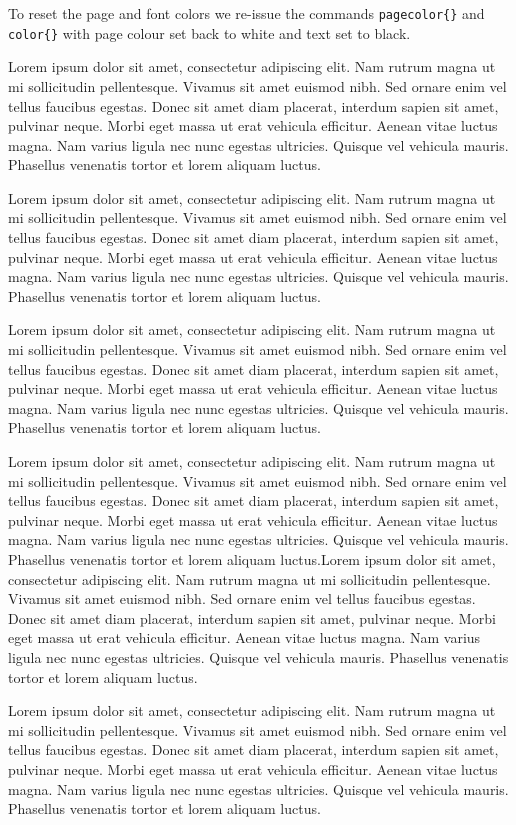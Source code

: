 \color{black}

To reset the page and font colors we re-issue the commands \verb|pagecolor{}| and  \verb|color{}| with page colour set back to white and text set to black. 

\vspace{0.4cm}

Lorem ipsum dolor sit amet, consectetur adipiscing elit. Nam rutrum magna ut mi sollicitudin pellentesque. Vivamus sit amet euismod nibh. Sed ornare enim vel tellus faucibus egestas. Donec sit amet diam placerat, interdum sapien sit amet, pulvinar neque. Morbi eget massa ut erat vehicula efficitur. Aenean vitae luctus magna. Nam varius ligula nec nunc egestas ultricies. Quisque vel vehicula mauris. Phasellus venenatis tortor et lorem aliquam luctus.


Lorem ipsum dolor sit amet, consectetur adipiscing elit. Nam rutrum magna ut mi sollicitudin pellentesque. Vivamus sit amet euismod nibh. Sed ornare enim vel tellus faucibus egestas. Donec sit amet diam placerat, interdum sapien sit amet, pulvinar neque. Morbi eget massa ut erat vehicula efficitur. Aenean vitae luctus magna. Nam varius ligula nec nunc egestas ultricies. Quisque vel vehicula mauris. Phasellus venenatis tortor et lorem aliquam luctus.


Lorem ipsum dolor sit amet, consectetur adipiscing elit. Nam rutrum magna ut mi sollicitudin pellentesque. Vivamus sit amet euismod nibh. Sed ornare enim vel tellus faucibus egestas. Donec sit amet diam placerat, interdum sapien sit amet, pulvinar neque. Morbi eget massa ut erat vehicula efficitur. Aenean vitae luctus magna. Nam varius ligula nec nunc egestas ultricies. Quisque vel vehicula mauris. Phasellus venenatis tortor et lorem aliquam luctus.



Lorem ipsum dolor sit amet, consectetur adipiscing elit. Nam rutrum magna ut mi sollicitudin pellentesque. Vivamus sit amet euismod nibh. Sed ornare enim vel tellus faucibus egestas. Donec sit amet diam placerat, interdum sapien sit amet, pulvinar neque. Morbi eget massa ut erat vehicula efficitur. Aenean vitae luctus magna. Nam varius ligula nec nunc egestas ultricies. Quisque vel vehicula mauris. Phasellus venenatis tortor et lorem aliquam luctus.Lorem ipsum dolor sit amet, consectetur adipiscing elit. Nam rutrum magna ut mi sollicitudin pellentesque. Vivamus sit amet euismod nibh. Sed ornare enim vel tellus faucibus egestas. Donec sit amet diam placerat, interdum sapien sit amet, pulvinar neque. Morbi eget massa ut erat vehicula efficitur. Aenean vitae luctus magna. Nam varius ligula nec nunc egestas ultricies. Quisque vel vehicula mauris. Phasellus venenatis tortor et lorem aliquam luctus.


Lorem ipsum dolor sit amet, consectetur adipiscing elit. Nam rutrum magna ut mi sollicitudin pellentesque. Vivamus sit amet euismod nibh. Sed ornare enim vel tellus faucibus egestas. Donec sit amet diam placerat, interdum sapien sit amet, pulvinar neque. Morbi eget massa ut erat vehicula efficitur. Aenean vitae luctus magna. Nam varius ligula nec nunc egestas ultricies. Quisque vel vehicula mauris. Phasellus venenatis tortor et lorem aliquam luctus.


\newpage

